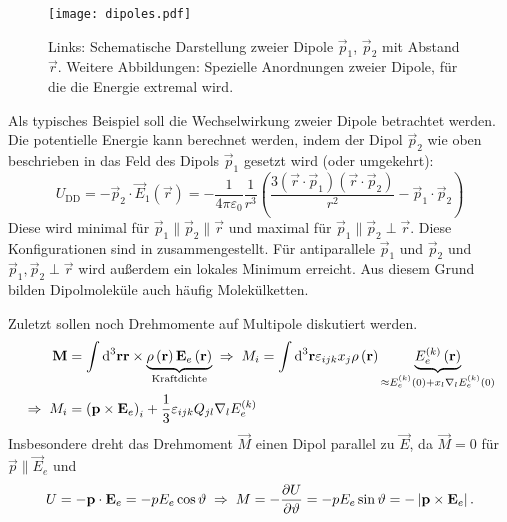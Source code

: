 \begin{figure}[htb]
	\centering
	\texttt{[image: dipoles.pdf]}
	\caption{Links: Schematische Darstellung zweier Dipole $\vec p_1$, $\vec p_2$ mit Abstand $\vec r$. Weitere Abbildungen: Spezielle Anordnungen zweier Dipole, für die die Energie extremal wird. }
	\label{fig:dipoles}
\end{figure}

Als typisches Beispiel soll die Wechselwirkung zweier Dipole betrachtet werden. Die potentielle Energie kann berechnet werden, indem der Dipol $\vec {p}_{2}$ wie oben beschrieben in das Feld des Dipols $\vec {p}_{1}$ gesetzt wird (oder umgekehrt):
\begin{equation*}
	U_{\mathrm{DD}}=-\vec {p}_{2}\cdot \vec {E}_{1}\left(\vec {r}\right)=-\frac{1}{4\pi \varepsilon _{0}}\frac{1}{r^{3}}\left(\frac{3\left(\vec {r}\cdot \vec {p}_{1}\right)\left(\vec {r}\cdot \vec {p}_{2}\right)}{r^{2}}-\vec {p}_{1}\cdot \vec {p}_{2}\right)
\end{equation*}
Diese wird minimal für $\vec {p}_{1}\parallel \vec {p}_{2}\parallel \vec {r}$ und maximal für $\vec {p}_{1}\parallel \vec {p}_{2}\perp \vec {r}$. Diese Konfigurationen sind in  zusammengestellt. Für antiparallele $\vec {p}_{1}$ und $\vec {p}_{2}$ und $\vec {p}_{1},\vec {p}_{2}\perp \vec {r}$ wird außerdem ein lokales Minimum erreicht. Aus diesem Grund bilden Dipolmoleküle auch häufig Molekülketten.

Zuletzt sollen noch Drehmomente auf Multipole diskutiert werden.
\begin{align*}
		\mathbf{M}          & =\int \text{d} ^{3}\mathbf{r}\mathbf{r}\times \underset{\text{Kraftdichte}}{\underbrace{\rho \left(\mathbf{r}\right)\mathbf{E}_{e}\left(\mathbf{r}\right)}}\;\Rightarrow\; M_{i}=\int \text{d} ^{3}\mathbf{r}\varepsilon _{ijk}x_{j}\rho \left(\mathbf{r}\right)\underset{\approx E_{e}^{\left(k\right)}\left(0\right)+x_{l}\nabla _{l}E_{e}^{\left(k\right)}\left(0\right)}{\underbrace{E_{e}^{\left(k\right)}\left(\mathbf{r}\right)}} \\
		\;\Rightarrow\; M_{i} & =\left(\mathbf{p}\times \mathbf{E}_{e}\right)_{i}+\frac{1}{3}\varepsilon _{ijk}Q_{jl}\nabla _{l}E_{e}^{\left(k\right)}
\end{align*}
Insbesondere dreht das Drehmoment $\vec {M}$ einen Dipol parallel zu $\vec {E}$, da $\vec {M}=0$ für $\vec {p}\parallel \vec {E}_{e}$ und
\begin{equation*}
	U=-\mathbf{p}\cdot \mathbf{E}_{e}=-pE_{e}\cos \vartheta \;\Rightarrow\; M=-\frac{\partial U}{\partial \vartheta }=-pE_{e}\sin \vartheta =-\left| \mathbf{p}\times \mathbf{E}_{e}\right| .
\end{equation*}